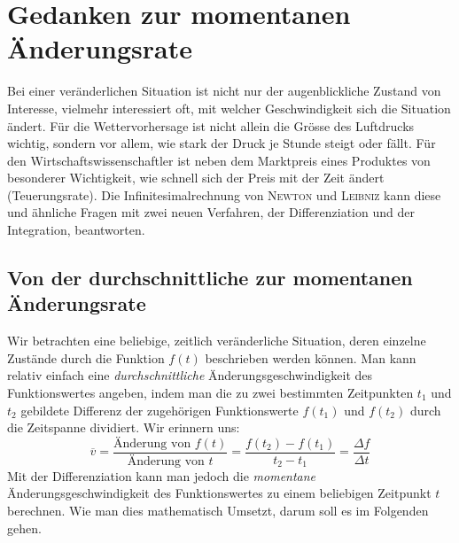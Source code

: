 \documentclass[%
11pt,%
twoside,%
titlepage,%
german,%
headsepline%
]{scrartcl}
\theoremstyle{definition}
\theoremstyle{plain}
\begin{document}
\clearpage

\section{Gedanken zur momentanen Änderungsrate}
Bei einer veränderlichen Situation ist nicht nur der augenblickliche Zustand von Interesse, vielmehr interessiert oft, mit welcher Geschwindigkeit sich die Situation ändert. Für die Wettervorhersage ist nicht allein die Grösse des Luftdrucks wichtig, sondern vor allem, wie stark der Druck je Stunde steigt oder fällt. Für den Wirtschaftswissenschaftler ist neben dem Marktpreis eines Produktes von besonderer Wichtigkeit, wie schnell sich der Preis mit der Zeit ändert (Teuerungsrate).
Die Infinitesimalrechnung von \textsc{Newton} und \textsc{Leibniz} kann diese und ähnliche Fragen mit zwei neuen Verfahren, der Differenziation und der Integration, beantworten.

\subsection{Von der durchschnittliche zur momentanen Änderungsrate}

Wir betrachten eine beliebige, zeitlich veränderliche Situation, deren einzelne Zustände durch die Funktion $f(t)$
beschrieben werden können. Man kann relativ einfach eine \emph{durchschnittliche} Än\-derungs\-ge\-schwin\-dig\-keit des Funktionswertes angeben, indem man die zu zwei bestimmten Zeitpunkten $t_1$ und $t_2$ gebildete Differenz der zugehörigen Funktionswerte $f(t_1)$ und $f(t_2)$ durch die Zeitspanne dividiert. Wir erinnern uns:
$$\overline{v}=\frac{\text{Änderung von }f(t)}{\text{Änderung von }t}=\frac{f(t_2)-f(t_1)}{t_2-t_1}=\frac{\Delta f}{\Delta t}$$
Mit der Differenziation kann man jedoch die \emph{momentane} Än\-derungs\-ge\-schwin\-dig\-keit des Funktionswertes zu einem beliebigen Zeitpunkt $t$ berechnen. Wie man dies mathematisch Umsetzt, darum soll es im Folgenden gehen.
\end{document}
